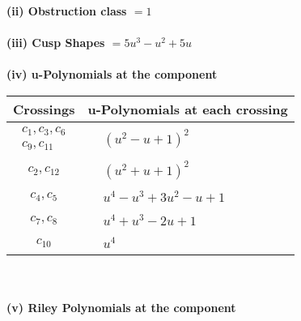 \documentclass[1p]{elsarticle_modified}
\theoremstyle{definition}
\begin{document}
\flushleft \textbf{(ii) Obstruction class $= 1$}\\~\\
\flushleft \textbf{(iii) Cusp Shapes $= 5 u^3- u^2+5 u$}\\~\\
\newpage\renewcommand{\arraystretch}{1}
\flushleft \textbf{(iv) u-Polynomials at the component}\newline \\
\begin{tabular}{m{50pt}|m{274pt}}
Crossings & \hspace{64pt}u-Polynomials at each crossing \\
\hline $$\begin{aligned}c_{1},c_{3},c_{6}\\c_{9},c_{11}\end{aligned}$$&$\begin{aligned}
&(u^2- u+1)^2
\end{aligned}$\\
\hline $$\begin{aligned}c_{2},c_{12}\end{aligned}$$&$\begin{aligned}
&(u^2+u+1)^2
\end{aligned}$\\
\hline $$\begin{aligned}c_{4},c_{5}\end{aligned}$$&$\begin{aligned}
&u^4- u^3+3 u^2- u+1
\end{aligned}$\\
\hline $$\begin{aligned}c_{7},c_{8}\end{aligned}$$&$\begin{aligned}
&u^4+u^3-2 u+1
\end{aligned}$\\
\hline $$\begin{aligned}c_{10}\end{aligned}$$&$\begin{aligned}
&u^4
\end{aligned}$\\
\hline
\end{tabular}\\~\\
\newpage\renewcommand{\arraystretch}{1}
\flushleft \textbf{(v) Riley Polynomials at the component}\newline \\
\end{document}

